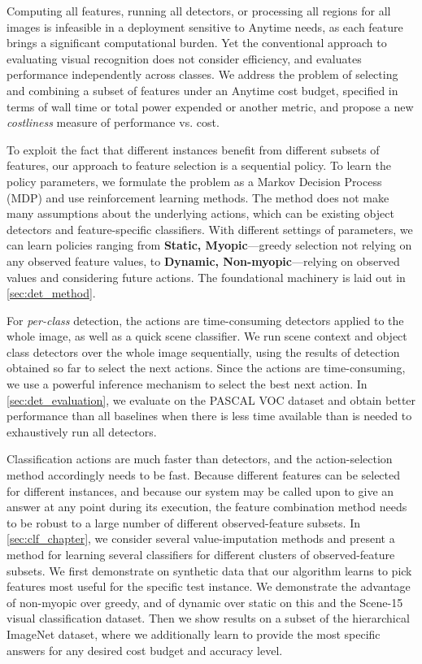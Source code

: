 Computing all features, running all detectors, or processing all regions for all images is infeasible in a deployment sensitive to Anytime needs, as each feature brings a significant computational burden.
Yet the conventional approach to evaluating visual recognition does not consider efficiency, and evaluates performance independently across classes.
We address the problem of selecting and combining a subset of features under an Anytime cost budget, specified in terms of wall time or total power expended or another metric, and propose a new \emph{costliness} measure of performance vs. cost.

To exploit the fact that different instances benefit from different subsets of features, our approach to feature selection is a sequential policy.
To learn the policy parameters, we formulate the problem as a Markov Decision Process (MDP) and use reinforcement learning methods.
The method does not make many assumptions about the underlying actions, which can be existing object detectors and feature-specific classifiers.
With different settings of parameters, we can learn policies ranging from \textbf{Static, Myopic}---greedy selection not relying on any observed feature values, to \textbf{Dynamic, Non-myopic}---relying on observed values and considering future actions.
The foundational machinery is laid out in \autoref{sec:det_method}.

For \emph{per-class} detection, the actions are time-consuming detectors applied to the whole image, as well as a quick scene classifier.
We run scene context and object class detectors over the whole image sequentially, using the results of detection obtained so far to select the next actions.
Since the actions are time-consuming, we use a powerful inference mechanism to select the best next action.
In \autoref{sec:det_evaluation}, we evaluate on the PASCAL VOC dataset and obtain better performance than all baselines when there is less time available than is needed to exhaustively run all detectors.

Classification actions are much faster than detectors, and the action-selection method accordingly needs to be fast.
Because different features can be selected for different instances, and because our system may be called upon to give an answer at any point during its execution, the feature combination method needs to be robust to a large number of different observed-feature subsets.
In \autoref{sec:clf_chapter}, we consider several value-imputation methods and present a method for learning several classifiers for different clusters of observed-feature subsets.
We first demonstrate on synthetic data that our algorithm learns to pick features most useful for the specific test instance.
We demonstrate the advantage of non-myopic over greedy, and of dynamic over static on this and the Scene-15 visual classification dataset.
Then we show results on a subset of the hierarchical ImageNet dataset, where we additionally learn to provide the most specific answers for any desired cost budget and accuracy level.

